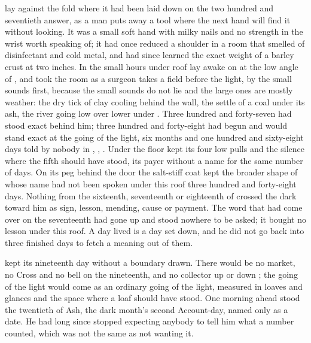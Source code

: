 
 lay against the fold where it had been laid down on the two hundred and seventieth answer, as a man puts away a tool where the next hand will find it without looking. It was a small soft hand with milky nails and no strength in the wrist worth speaking of; it had once reduced a shoulder in a room that smelled of disinfectant and cold metal, and had since learned the exact weight of a barley crust at two inches. In the small hours under  roof  lay awake on  at the low angle of , and took the room as a surgeon takes a field before the light, by the small sounds first, because the small sounds do not lie and the large ones are mostly weather: the dry tick of clay cooling behind the wall, the settle of a coal under its ash, the river going low over lower under . Three hundred and forty-seven had stood exact behind him; three hundred and forty-eight had begun and would stand exact at the going of the light, six months and one hundred and sixty-eight days told by nobody in , , . Under the floor  kept its four low pulls and the silence where the fifth should have stood, its payer without a name for the same number of days. On its peg behind the door the salt-stiff coat kept the broader shape of  whose name had not been spoken under this roof three hundred and forty-eight days. Nothing from the sixteenth, seventeenth or eighteenth of  crossed the dark toward him as sign, lesson, mending, cause or payment. The word that had come over  on the seventeenth had gone up  and stood nowhere to be asked; it bought no lesson under this roof. A day lived is a day set down, and he did not go back into three finished days to fetch a meaning out of them.

 kept its nineteenth day without a boundary drawn. There would be no market, no Cross and no bell on the nineteenth, and no collector up or down ; the going of the light would come as an ordinary going of the light, measured in loaves and glances and the space where a loaf should have stood. One morning ahead stood the twentieth of Ash, the dark month's second Account-day, named only as a date. He had long since stopped expecting anybody to tell him what a number counted, which was not the same as not wanting it.

